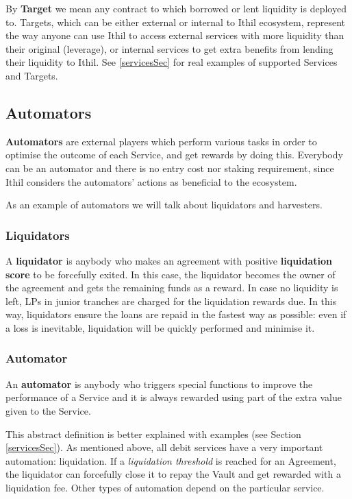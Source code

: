 \documentclass[a4paper,10 pt]{article}
\theoremstyle{definition}
\begin{document}
By {\bf Target} we mean any contract to which borrowed or lent liquidity is deployed to. Targets, which can be either external or internal to Ithil ecosystem, represent the way anyone can use Ithil to access external services with more liquidity than their original (leverage), or internal services to get extra benefits from lending their liquidity to Ithil. See \ref{servicesSec} for real examples of supported Services and Targets.

\subsection{Automators}\label{automatorsSub}

{\bf Automators} are external players which perform various tasks in order to optimise the outcome of each Service, and get rewards by doing this. Everybody can be an automator and there is no entry cost nor staking requirement, since Ithil considers the automators' actions as beneficial to the ecosystem. 

As an example of automators we will talk about liquidators and harvesters.

\subsubsection{Liquidators}\label{liquidatorSubSub}
A {\bf liquidator} is anybody who makes an agreement with positive {\bf liquidation score} to be forcefully exited. In this case, the liquidator becomes the owner of the agreement and gets the remaining funds as a reward. In case no liquidity is left, LPs in junior tranches are charged for the liquidation rewards due. In this way, liquidators ensure the loans are repaid in the fastest way as possible: even if a loss is inevitable, liquidation will be quickly performed and minimise it.

\subsubsection{Automator}\label{automatorSubSub}
An {\bf automator} is anybody who triggers special functions to improve the performance of a Service and it is always rewarded using part of the extra value given to the Service. 

This abstract definition is better explained with examples (see Section \ref{servicesSec}). As mentioned above, all debit services have a very important automation: liquidation. If a {\it liquidation threshold} is reached for an Agreement, the liquidator can forcefully close it to repay the Vault and get rewarded with a liquidation fee. Other types of automation depend on the particular service.
\end{document}
